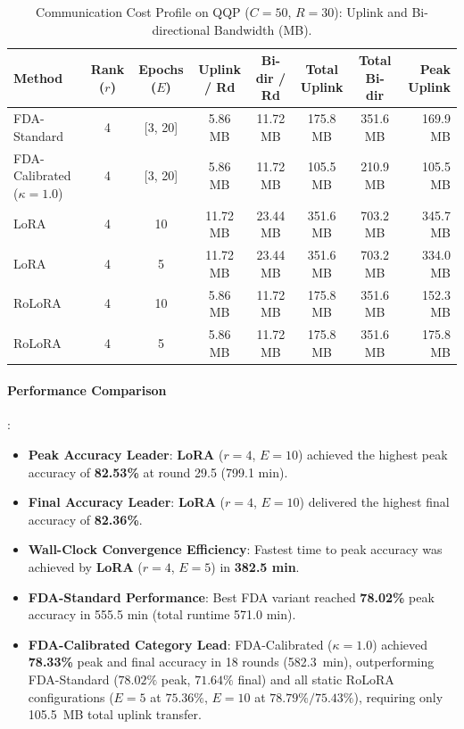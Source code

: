 \documentclass[10pt,a4paper]{article}
\begin{document}
\begin{table}[H]
\centering
\caption{Communication Cost Profile on QQP ($C=50$, $R=30$): Uplink and Bi-directional Bandwidth (MB).}
\scriptsize
\setlength{\tabcolsep}{4.0pt}
\begin{tabular*}{\textwidth}{@{\extracolsep{\fill}}lccccccr@{}}
\toprule
\textbf{Method} & \textbf{Rank ($r$)} & \textbf{Epochs ($E$)} & \textbf{Uplink / Rd} & \textbf{Bi-dir / Rd} & \textbf{Total Uplink} & \textbf{Total Bi-dir} & \textbf{Peak Uplink} \\
\midrule
FDA-Standard & 4 & [3, 20] & 5.86 MB & 11.72 MB & 175.8 MB & 351.6 MB & 169.9 MB \\
FDA-Calibrated ($\kappa=1.0$) & 4 & [3, 20] & 5.86 MB & 11.72 MB & 105.5 MB & 210.9 MB & 105.5 MB \\
LoRA & 4 & 10 & 11.72 MB & 23.44 MB & 351.6 MB & 703.2 MB & 345.7 MB \\
LoRA & 4 & 5 & 11.72 MB & 23.44 MB & 351.6 MB & 703.2 MB & 334.0 MB \\
RoLoRA & 4 & 10 & 5.86 MB & 11.72 MB & 175.8 MB & 351.6 MB & 152.3 MB \\
RoLoRA & 4 & 5 & 5.86 MB & 11.72 MB & 175.8 MB & 351.6 MB & 175.8 MB \\
\bottomrule
\end{tabular*}
\end{table}

\paragraph{Performance Comparison}:
\begin{itemize}
    \item \textbf{Peak Accuracy Leader}: \textbf{LoRA} ($r=4$, $E=10$) achieved the highest peak accuracy of \textbf{82.53\%} at round 29.5 (799.1 min).
    \item \textbf{Final Accuracy Leader}: \textbf{LoRA} ($r=4$, $E=10$) delivered the highest final accuracy of \textbf{82.36\%}.
    \item \textbf{Wall-Clock Convergence Efficiency}: Fastest time to peak accuracy was achieved by \textbf{LoRA} ($r=4$, $E=5$) in \textbf{382.5 min}.
    \item \textbf{FDA-Standard Performance}: Best FDA variant reached \textbf{78.02\%} peak accuracy in 555.5 min (total runtime 571.0 min).
    \item \textbf{FDA-Calibrated Category Lead}: FDA-Calibrated ($\kappa=1.0$) achieved \textbf{78.33\%} peak and final accuracy in 18 rounds (582.3~min), outperforming FDA-Standard ($78.02\%$ peak, $71.64\%$ final) and all static RoLoRA configurations ($E=5$ at $75.36\%$, $E=10$ at $78.79\%/75.43\%$), requiring only 105.5~MB total uplink transfer.
\end{itemize}
\end{document}
